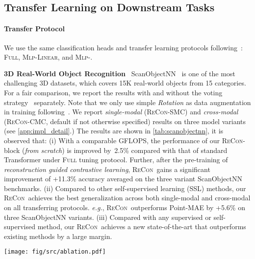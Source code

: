 \documentclass{article}
\theoremstyle{plain}
\theoremstyle{definition}
\theoremstyle{remark}
\def\eg{{\it{e.g.}}}
\def\recon{{\scshape ReCon}}
\begin{document}
\subsection{Transfer Learning on Downstream Tasks}
\vspace{-5pt}
\paragraph{Transfer Protocol}
We use the same classification heads and transfer learning protocols following~\citet{ACT23}: {\scshape Full}, {\scshape Mlp-Linear}, and {\scshape Mlp-}. 

\textbf{3D Real-World Object Recognition}~
ScanObjectNN~\citep{ScanObjectNN19} is one of the most challenging 3D datasets, which covers 15K real-world objects from 15 categories.
For a fair comparison, we report the results with and without the voting strategy~\citep{RSCNN} separately. 
Note that we only use simple \textit{Rotation} as data augmentation in training following~\citet{ACT23}.
We report \textit{single-modal} (\recon-SMC) and \textit{cross-modal} (\recon-CMC, default if not otherwise specified) results on three model variants (see \cref{app:impl_detail}.) 
The results are shown in \cref{tab:scanobjectnn}, it is observed that: 
(i) With a comparable GFLOPS, the performance of our \recon-block (\textit{from scratch}) is improved by~2.5\% compared with that of standard Transformer under {\scshape Full} tuning protocol. 
Further, after the pre-training of \textit{reconstruction guided contrastive learning}, \recon\ gains a significant improvement of +11.3\% accuracy averaged on the three variant ScanObjectNN benchmarks.
(ii) Compared to other self-supervised learning (SSL) methods, our \recon\ achieves the best generalization across both single-modal and cross-modal on all transferring protocols. 
\eg, \recon\ outperforms Point-MAE by +5.6\% on three ScanObjectNN variants. 
(iii) Compared with any supervised or self-supervised method, our \recon\ achieves a new state-of-the-art that outperforms existing methods by a large margin. 
\begin{figure*}[h!]
    \begin{center}
    \texttt{[image: fig/src/ablation.pdf]}
    \vspace{-15pt}
    \caption{\textbf{Ablation study of masking ratio, decoder depth, and the 2D teacher encoder choice used during \recon~pretraining.} The masking ratio and decoder depth represent the ablation for the generative masked modeling stream, and the 2D teachers are used for contrastive cross-modal learning. }\label{fig:ablation}
    \end{center}
    \vspace{-22pt}
\end{figure*} 
\end{document}
